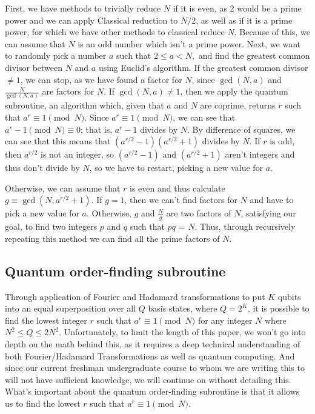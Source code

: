 \documentclass{article}
\begin{document}
First, we have methods to trivially reduce $N$ if it is even, as 2 would be a prime power and we can apply Classical reduction to $N/2$, as well as if it is a prime power, for which we have other methods to classical reduce $N$. Because of this, we can assume that $N$ is an odd number which isn't a prime power. Next, we want to randomly pick a number $a$ such that $2\leq a<N,$ and find the greatest common divisor between $N$ and $a$ using Euclid's algorithm. If the greatest common divisor $\neq 1$, we can stop, as we have found a factor for $N$, since $\gcd(N,a)$ and $\frac{N}{\gcd(N,a)}$ are factors for $N$. If $\gcd(N,a)\neq1$, then we apply the quantum subroutine, an algorithm which, given that $a$ and $N$ are coprime, returns $r$ such that $a^{r} \equiv 1\pmod{N}$. Since $a^{r} \equiv 1\pmod{N}$, we can see that $a^r-1\pmod{N}\equiv0$; that is, $a^r-1$ divides by $N$. By difference of squares, we can see that this means that $(a^{r/2}-1)(a^{r/2}+1)$ divides by $N$. If $r$ is odd, then $a^{r/2}$ is not an integer, so $(a^{r/2}-1)$ and $(a^{r/2}+1)$ aren't integers and thus don't divide by $N$, so we have to restart, picking a new value for $a$. 

Otherwise, we can assume that $r$ is even and thus calculate $g\equiv\gcd(N,a^{r/2}+1)$. If $g=1$, then we can't find factors for $N$ and have to pick a new value for $a$. Otherwise, $g$ and $\frac{N}{g}$ are two factors of $N$, satisfying our goal, to find two integers $p$ and $q$ such that $pq$ = $N$. Thus, through recursively repeating this method we can find all the prime factors of $N$.

\subsection{Quantum order-finding subroutine}
Through application of Fourier and Hadamard transformations to put $K$ qubits into an equal superposition over all $Q$ basis states, where $Q = 2^K$, it is possible to find the lowest integer $r$ such that $a^{r} \equiv 1\pmod{N}$ for any integer $N$ where  $N^2\leq Q\leq 2N^2$. Unfortunately, to limit the length of this paper, we won't go into depth on the math behind this, as it requires a deep technical understanding of both Fourier/Hadamard Transformations as well as quantum computing. And since our current freshman undergraduate course to whom we are writing this to will not have sufficient knowledge, we will continue on without detailing this. What's important about the quantum order-finding subroutine is that it allows us to find the lowest $r$ such that $a^{r} \equiv 1\pmod{N}$. 
\end{document}
